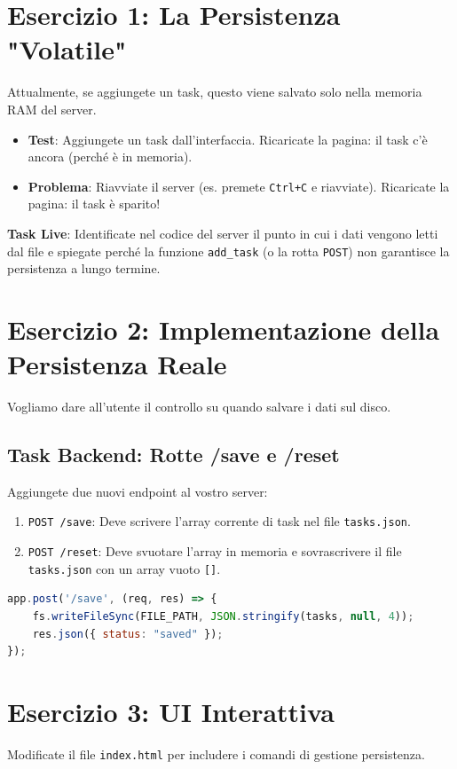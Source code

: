 \documentclass[11pt,a4paper]{article}
\begin{document}
\section{Esercizio 1: La Persistenza "Volatile"}
Attualmente, se aggiungete un task, questo viene salvato solo nella memoria RAM del server.
\begin{itemize}
    \item \textbf{Test}: Aggiungete un task dall'interfaccia. Ricaricate la pagina: il task c'è ancora (perché è in memoria).
    \item \textbf{Problema}: Riavviate il server (es. premete \texttt{Ctrl+C} e riavviate). Ricaricate la pagina: il task è sparito!
\end{itemize}

\textbf{Task Live}: Identificate nel codice del server il punto in cui i dati vengono letti dal file e spiegate perché la funzione \texttt{add\_task} (o la rotta \texttt{POST}) non garantisce la persistenza a lungo termine.

\section{Esercizio 2: Implementazione della Persistenza Reale}
Vogliamo dare all'utente il controllo su quando salvare i dati sul disco.

\subsection{Task Backend: Rotte /save e /reset}
Aggiungete due nuovi endpoint al vostro server:
\begin{enumerate}
    \item \texttt{POST /save}: Deve scrivere l'array corrente di task nel file \texttt{tasks.json}.
    \item \texttt{POST /reset}: Deve svuotare l'array in memoria e sovrascrivere il file \texttt{tasks.json} con un array vuoto \texttt{[]}.
\end{enumerate}

\begin{lstlisting}[language=javascript, caption=Esempio Express]
app.post('/save', (req, res) => {
    fs.writeFileSync(FILE_PATH, JSON.stringify(tasks, null, 4));
    res.json({ status: "saved" });
});
\end{lstlisting}

\section{Esercizio 3: UI Interattiva}
Modificate il file \texttt{index.html} per includere i comandi di gestione persistenza.
\end{document}
